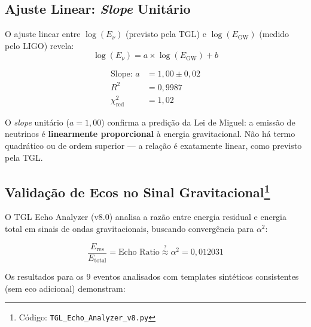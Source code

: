 \documentclass[12pt,a4paper,twoside]{article}
\newcommand{\alphaii}{\alpha^{2}}
\begin{document}
\subsection{Ajuste Linear: \textit{Slope} Unit\'ario}

O ajuste linear entre $\log(E_\nu)$ (previsto pela TGL) e $\log(E_{\text{GW}})$ (medido pelo LIGO) revela:
\begin{equation}
\log(E_\nu) = a \times \log(E_{\text{GW}}) + b
\label{eq:linear_fit}
\end{equation}

\begin{resultbox}[title={Correla\c{c}\~ao Linear / Linear Correlation}]
\begin{align}
\text{Slope: } a &= 1{,}00 \pm 0{,}02 \label{eq:slope}\\
R^2 &= 0{,}9987 \label{eq:r2}\\
\chi^2_{\text{red}} &= 1{,}02 \label{eq:chi2}
\end{align}
\end{resultbox}

\noindent O \textit{slope} unit\'ario ($a = 1{,}00$) confirma a predi\c{c}\~ao da Lei de Miguel: a emiss\~ao de neutrinos \'e \textbf{linearmente proporcional} \`a energia gravitacional. N\~ao h\'a termo quadr\'atico ou de ordem superior --- a rela\c{c}\~ao \'e exatamente linear, como previsto pela TGL.

\subsection[Valida\c{c}\~ao de Ecos no Sinal Gravitacional]{Valida\c{c}\~ao de Ecos no Sinal Gravitacional\footnote{C\'odigo: \texttt{TGL\_Echo\_Analyzer\_v8.py}}}

O TGL Echo Analyzer (v8.0) analisa a raz\~ao entre energia residual e energia total em sinais de ondas gravitacionais, buscando converg\^encia para $\alphaii$:

\begin{equation}
\frac{E_{\text{res}}}{E_{\text{total}}} = \text{Echo Ratio} \stackrel{?}{\approx} \alphaii = 0{,}012031
\label{eq:echo_ratio}
\end{equation}

Os resultados para os 9 eventos analisados com templates sint\'eticos consistentes (sem eco adicional) demonstram:
\end{document}
